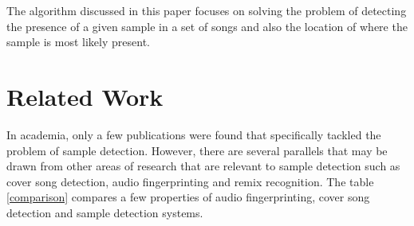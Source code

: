 \documentclass{article}
\begin{document}
The algorithm discussed in this paper focuses on solving the problem of detecting the presence of a given sample in a set of songs and also the location of where the sample is most likely present.

%
\section{Related Work}
\label{related}

In academia, only a few publications were found that specifically tackled the problem of sample detection. However, there are several parallels that may be drawn from other areas of research that are relevant to sample detection such as cover song detection, audio fingerprinting and remix recognition. The table \ref{comparison} compares a few properties of audio fingerprinting, cover song detection and sample detection systems.
\end{document}
